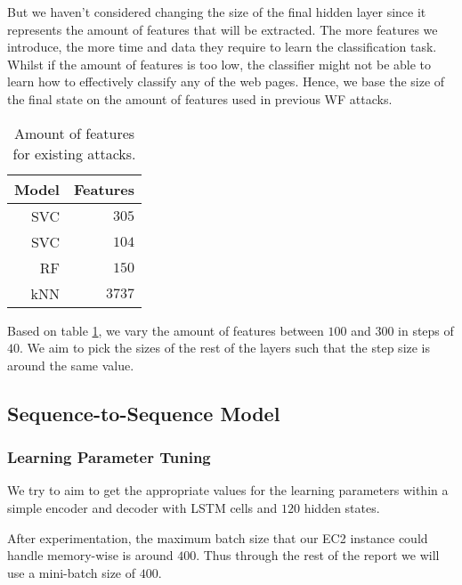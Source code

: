 
But we haven't considered changing the size of the final hidden layer since it represents the amount of features that will be extracted.
The more features we introduce, the more time and data they require to learn the classification task.
Whilst if the amount of features is too low, the classifier might not be able to learn how to effectively classify any of the web pages.
Hence, we base the size of the final state on the amount of features used in previous WF attacks.

\begin{table}[ht]
  \centering
  \begin{tabular}{ r r } \hline
    \multicolumn{1}{c}{\textbf{Model}} & \multicolumn{1}{c}{\textbf{Features}} \\ \hline
    SVC \cite{panchenko1} & $305$ \\
    SVC \cite{panchenko2} & $104$ \\
    RF \cite{kfingerprinting} & $150$ \\
    kNN \cite{wang_cai_johnson_nithyanand_goldberg_2014} & $3737$ \\
    \hline
  \end{tabular}
  \caption{Amount of features for existing attacks.}
  \label{table:feature-wf-attacks}
\end{table}

Based on table \ref{table:feature-wf-attacks}, we vary the amount of features between $100$ and $300$ in steps of $40$.
We aim to pick the sizes of the rest of the layers such that the step size is around the same value.


\subsection{Sequence-to-Sequence Model}

\subsubsection{Learning Parameter Tuning}

We try to aim to get the appropriate values for the learning parameters within a simple encoder and decoder with LSTM cells and $120$ hidden states.

After experimentation, the maximum batch size that our EC2 instance could handle memory-wise is around $400$.
Thus through the rest of the report we will use a mini-batch size of $400$.

